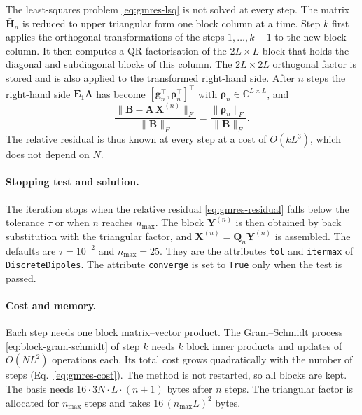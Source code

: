 \documentclass[11pt,a4paper]{article}
\begin{document}
The least-squares problem \eqref{eq:gmres-lsq} is not solved at every
step.
The matrix $\bar{\mathbf{H}}_n$ is reduced to upper triangular form
one block column at a time.
Step $k$ first applies the orthogonal transformations of the steps
$1, \ldots, k-1$ to the new block column.
It then computes a QR factorisation of the $2L \times L$ block that
holds the diagonal and subdiagonal blocks of this column.
The $2L \times 2L$ orthogonal factor is stored and is also applied to
the transformed right-hand side.
After $n$ steps the right-hand side
$\mathbf{E}_1 \boldsymbol{\Lambda}$ has become
$[\mathbf{g}_n^\top, \boldsymbol{\rho}_n^\top]^\top$ with
$\boldsymbol{\rho}_n \in \mathbb{C}^{L \times L}$, and
\begin{equation}
  \frac{\| \mathbf{B} - \mathbf{A}\,\mathbf{X}^{(n)} \|_F}
       {\| \mathbf{B} \|_F}
  = \frac{\| \boldsymbol{\rho}_n \|_F}{\| \mathbf{B} \|_F} .
  \label{eq:gmres-residual}
\end{equation}
The relative residual is thus known at every step at a cost of
$O(k L^3)$, which does not depend on $N$.

\paragraph{Stopping test and solution.}
The iteration stops when the relative residual
\eqref{eq:gmres-residual} falls below the tolerance $\tau$ or when
$n$ reaches $n_{\max}$.
The block $\mathbf{Y}^{(n)}$ is then obtained by back substitution
with the triangular factor, and
$\mathbf{X}^{(n)} = \mathbf{Q}_n \mathbf{Y}^{(n)}$ is assembled.
The defaults are $\tau = 10^{-2}$ and $n_{\max} = 25$.
They are the attributes \texttt{tol} and \texttt{itermax} of
\texttt{DiscreteDipoles}.
The attribute \texttt{converge} is set to \texttt{True} only when the
test is passed.

\paragraph{Cost and memory.}
Each step needs one block matrix--vector product.
The Gram--Schmidt process \eqref{eq:block-gram-schmidt} of step $k$
needs $k$ block inner products and updates of $O(N L^2)$ operations
each.
Its total cost grows quadratically with the number of steps
(Eq.~\eqref{eq:gmres-cost}).
The method is not restarted, so all blocks are kept.
The basis needs $16 \cdot 3N \cdot L \cdot (n+1)$ bytes after $n$
steps.
The triangular factor is allocated for $n_{\max}$ steps and takes
$16\,(n_{\max} L)^2$ bytes.
\end{document}

